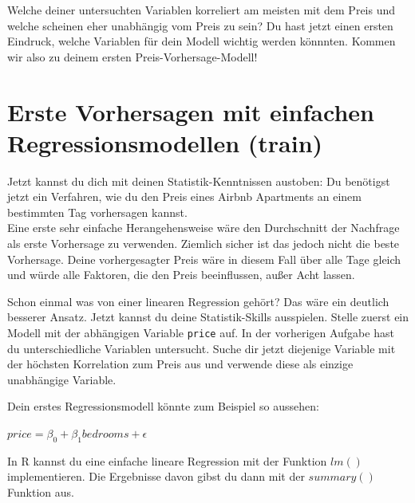 \documentclass[
]{book}
\begin{document}
Welche deiner untersuchten Variablen korreliert am meisten mit dem Preis und welche scheinen eher unabhängig vom Preis zu sein?
Du hast jetzt einen ersten Eindruck, welche Variablen für dein Modell wichtig werden könnnten.
Kommen wir also zu deinem ersten Preis-Vorhersage-Modell!

\hypertarget{erste-vorhersagen-mit-einfachen-regressionsmodellen-train}{%
\section{Erste Vorhersagen mit einfachen Regressionsmodellen (train)}\label{erste-vorhersagen-mit-einfachen-regressionsmodellen-train}}

Jetzt kannst du dich mit deinen Statistik-Kenntnissen austoben:
Du benötigst jetzt ein Verfahren, wie du den Preis eines Airbnb Apartments an einem bestimmten Tag vorhersagen kannst.\\
Eine erste sehr einfache Herangehensweise wäre den Durchschnitt der Nachfrage als erste Vorhersage zu verwenden. Ziemlich sicher ist das jedoch nicht die beste Vorhersage.
Deine vorhergesagter Preis wäre in diesem Fall über alle Tage gleich und würde alle Faktoren, die den Preis beeinflussen, außer Acht lassen.

Schon einmal was von einer linearen Regression gehört? Das wäre ein deutlich besserer Ansatz.
Jetzt kannst du deine Statistik-Skills ausspielen.
Stelle zuerst ein Modell mit der abhängigen Variable \texttt{price} auf.
In der vorherigen Aufgabe hast du unterschiedliche Variablen untersucht.
Suche dir jetzt diejenige Variable mit der höchsten Korrelation zum Preis aus und verwende diese als einzige unabhängige Variable.

Dein erstes Regressionsmodell könnte zum Beispiel so aussehen:

\begin{center} $price = \beta_0 + \beta_1 bedrooms + \epsilon$ \end{center}

In R kannst du eine einfache lineare Regression mit der Funktion \(lm()\) implementieren. Die Ergebnisse davon gibst du dann mit der \(summary()\) Funktion aus.
\end{document}
